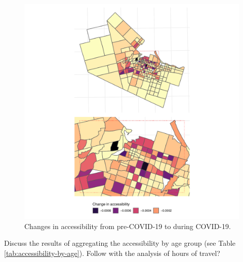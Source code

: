 \documentclass[]{elsarticle} %
\begin{document}
\begin{figure}

{\centering \includegraphics[width=1\linewidth]{Accessibility-Foodbanks-Hamilton_files/figure-latex/plot-accessibility-changes-1} 

}

\caption{\label{fig:accessibility-changes}Changes in accessibility from pre-COVID-19 to during COVID-19.}\label{fig:plot-accessibility-changes}
\end{figure}

Discuss the results of aggregating the accessibility by age group (see
Table \ref{tab:accessibility-by-age}). Follow with the analysis of hours
of travel?
\end{document}
